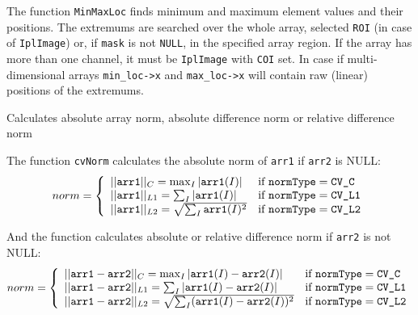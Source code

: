 \begin{description}
\end{description}

The function \texttt{MinMaxLoc} finds minimum and maximum element values
and their positions. The extremums are searched over the whole array,
selected \texttt{ROI} (in case of \texttt{IplImage}) or, if \texttt{mask}
is not \texttt{NULL}, in the specified array region. If the array has
more than one channel, it must be \texttt{IplImage} with \texttt{COI}
set. In case if multi-dimensional arrays \texttt{min\_loc->x} and \texttt{max\_loc->x}
will contain raw (linear) positions of the extremums.

\label{Norm}

Calculates absolute array norm, absolute difference norm or relative difference norm


\begin{description}
\end{description}

The function \texttt{cvNorm} calculates the absolute norm of \texttt{arr1} if \texttt{arr2} is NULL:
\[
norm = \left\{ \begin{array}{l l} ||\texttt{arr1}||_C    = \max_I |\texttt{arr1}(I)| & \mbox{if $\texttt{normType} = \texttt{CV\_C}$}\\ ||\texttt{arr1}||_{L1} = \sum_I |\texttt{arr1}(I)| & \mbox{if $\texttt{normType} = \texttt{CV\_L1}$}\\ ||\texttt{arr1}||_{L2} = \sqrt{\sum_I \texttt{arr1}(I)^2} & \mbox{if $\texttt{normType} = \texttt{CV\_L2}$}\\ \end{array} \right.
\]

And the function calculates absolute or relative difference norm if \texttt{arr2} is not NULL:
\[
norm = \left\{ \begin{array}{l l} ||\texttt{arr1}-\texttt{arr2}||_C    = \max_I |\texttt{arr1}(I) - \texttt{arr2}(I)| & \mbox{if $\texttt{normType} = \texttt{CV\_C}$}\\ ||\texttt{arr1}-\texttt{arr2}||_{L1} = \sum_I |\texttt{arr1}(I) - \texttt{arr2}(I)| & \mbox{if $\texttt{normType} = \texttt{CV\_L1}$}\\ ||\texttt{arr1}-\texttt{arr2}||_{L2} = \sqrt{\sum_I (\texttt{arr1}(I) - \texttt{arr2}(I))^2} & \mbox{if $\texttt{normType} = \texttt{CV\_L2}$}\\ \end{array} \right.
\]

